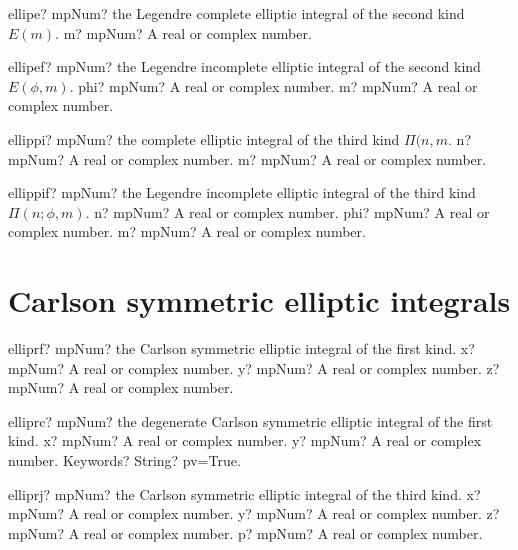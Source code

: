 \documentclass[12pt,a4paper,openany]{book}
\begin{document}
\begin{mpFunctionsExtract}
\mpFunctionOne
{ellipe? mpNum? the Legendre complete elliptic integral of the second kind $E(m)$.}
{m? mpNum? A real or complex number.}
\end{mpFunctionsExtract}

\begin{mpFunctionsExtract}
\mpFunctionTwo
{ellipef? mpNum? the Legendre incomplete elliptic integral of the second kind $E(\phi,m)$.}
{phi? mpNum? A real or complex number.}
{m? mpNum? A real or complex number.}
\end{mpFunctionsExtract}

\begin{mpFunctionsExtract}
\mpFunctionTwo
{ellippi? mpNum? the complete elliptic integral of the third kind $\Pi(n,m$.}
{n? mpNum? A real or complex number.}
{m? mpNum? A real or complex number.}
\end{mpFunctionsExtract}

\begin{mpFunctionsExtract}
\mpFunctionThree
{ellippif? mpNum? the Legendre incomplete elliptic integral of the third kind $\Pi(n;\phi,m)$.}
{n? mpNum? A real or complex number.}
{phi? mpNum? A real or complex number.}
{m? mpNum? A real or complex number.}
\end{mpFunctionsExtract}

\section{Carlson symmetric elliptic integrals}

\begin{mpFunctionsExtract}
\mpFunctionThree
{elliprf? mpNum? the Carlson symmetric elliptic integral of the first kind.}
{x? mpNum? A real or complex number.}
{y? mpNum? A real or complex number.}
{z? mpNum? A real or complex number.}
\end{mpFunctionsExtract}

\begin{mpFunctionsExtract}
\mpFunctionThree
{elliprc? mpNum? the degenerate Carlson symmetric elliptic integral of the first kind.}
{x? mpNum? A real or complex number.}
{y? mpNum? A real or complex number.}
{Keywords? String? pv=True.}
\end{mpFunctionsExtract}

\begin{mpFunctionsExtract}
\mpFunctionFour
{elliprj? mpNum? the Carlson symmetric elliptic integral of the third kind.}
{x? mpNum? A real or complex number.}
{y? mpNum? A real or complex number.}
{z? mpNum? A real or complex number.}
{p? mpNum? A real or complex number.}
\end{mpFunctionsExtract}
\end{document}
